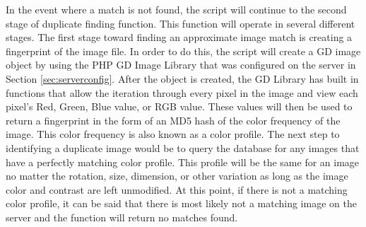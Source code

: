 In the event where a match is not found, the script will continue to the second stage of duplicate finding function. This function will operate in several different stages. The first stage toward finding an approximate image match is creating a fingerprint of the image file. In order to do this, the script will create a GD image object by using the PHP GD Image Library that was configured on the server in Section \ref{sec:serverconfig}. After the object is created, the GD Library has built in functions that allow the iteration through every pixel in the image and view each pixel's Red, Green, Blue value, or RGB value. These values will then be used to return a fingerprint in the form of an MD5 hash of the color frequency of the image. This color frequency is also known as a color profile. The next step to identifying a duplicate image would be to query the database for any images that have a perfectly matching color profile. This profile will be the same for an image no matter the rotation, size, dimension, or other variation as long as the image color and contrast are left unmodified. At this point, if there is not a matching color profile, it can be said that there is most likely not a matching image on the server and
the function will return no matches found.

